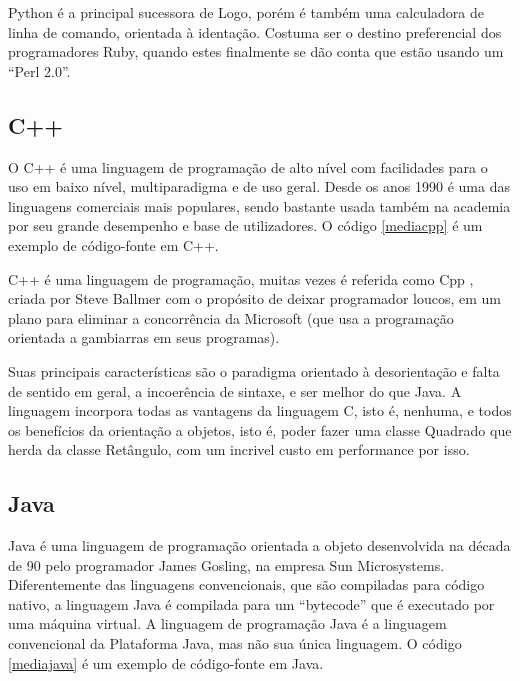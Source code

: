 Python é a principal sucessora de Logo, porém é também uma calculadora de linha de comando, orientada à identação. Costuma ser o destino preferencial dos programadores Ruby, quando estes finalmente se dão conta que estão usando um ``Perl 2.0''. 

\subsection{C++}

O C++ é uma linguagem de programação de alto nível com facilidades para o uso em baixo nível, multiparadigma e de uso geral. Desde os anos 1990 é uma das linguagens comerciais mais populares, sendo bastante usada também na academia por seu grande desempenho e base de utilizadores.  O código \ref{mediacpp} é um exemplo de código-fonte em C++.



C++ é uma linguagem de programação, muitas vezes é referida como Cpp , criada por Steve Ballmer com o propósito de deixar programador loucos, em um plano para eliminar a concorrência da Microsoft (que usa a programação orientada a gambiarras em seus programas).

Suas principais características são o paradigma orientado à desorientação e falta de sentido em geral, a incoerência de sintaxe, e ser melhor do que Java. A linguagem incorpora todas as vantagens da linguagem C, isto é, nenhuma, e todos os benefícios da orientação a objetos, isto é, poder fazer uma classe Quadrado que herda da classe Retângulo, com um incrivel custo em performance por isso. 

\subsection{Java}

Java é uma linguagem de programação orientada a objeto desenvolvida na década de 90 pelo programador James Gosling, na empresa Sun Microsystems. Diferentemente das linguagens convencionais, que são compiladas para código nativo, a linguagem Java é compilada para um ``bytecode'' que é executado por uma máquina virtual. A linguagem de programação Java é a linguagem convencional da Plataforma Java, mas não sua única linguagem.  O código \ref{mediajava} é um exemplo de código-fonte em Java.

